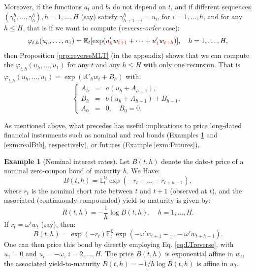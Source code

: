 \documentclass[
  12pt,
]{book}
\theoremstyle{definition}
\theoremstyle{definition}
\newtheorem{example}{Example}[chapter]
\theoremstyle{definition}
\theoremstyle{definition}
\theoremstyle{remark}
\begin{document}
Moreover, if the functions \(a_{t}\) and \(b_{t}\) do not depend on \(t\), and if different sequences \((\gamma^h_1,\dots,\gamma^h_h), h=1,\dots,H\) (say) satisfy \(\gamma^h_{h+1-i} = u_i\), for
\(i=1,\dots,h\), and for any \(h \leq H\), that is if we want to compute (\emph{reverse-order} case):
\begin{equation}
\varphi_{t,h}(u_h,\dots,u_1)=\mathbb{E}_t[\exp(u'_{{\color{red}h}} w_{{\color{red}t+1}}+\dots+u'_{{\color{red}1}} w_{{\color{red}t+h}})],
\quad h=1,\dots,H,\label{eq:LTreverse}
\end{equation}
then Proposition \ref{prp:reverseMLT} (in the appendix) shows that we can compute the \(\varphi_{t,h}(u_h,\dots,u_1)\) for any \(t\) and any \(h \leq H\) with only one recursion. That is \(\varphi_{t,h}(u_h,\dots,u_1)=\exp(A'_hw_t+B_h)\) with:
\begin{equation*}
\left\{
\begin{array}{ccl}
A_{h} &=& a(u_{h} + A_{h-1}), \\
B_{h} &=& b(u_{h} + A_{h-1}) + B_{h-1}, \\
A_{0} &=& 0,\quad  B_{0} = 0.
\end{array}
\right.
\end{equation*}

As mentioned above, what precedes has useful implications to price long-dated financial instruments such as nominal and real bonds (Examples \ref{exm:nominalBth} and \ref{exm:realBth}, respectively), or futures (Example \ref{exm:Futures}).

\begin{example}[Nominal interest rates]
\protect\hypertarget{exm:nominalBth}{}\label{exm:nominalBth}Let \(B(t,h)\) denote the date-\(t\) price of a nominal zero-coupon bond of maturity \(h\). We Have:
\begin{equation}
B(t,h) = \mathbb{E}^{\mathbb{Q}}_t \exp (-r_{t}-\dots-r_{t+h-1}),\label{eq:stdbond}
\end{equation}
where \(r_{t}\) is the nominal short rate between \(t\) and \(t+1\) (observed at \(t\)), and the associated (continuously-compounded) yield-to-maturity is given by:
\begin{equation}
R(t,h) = -  \frac{1}{h}   \log   B(t,h), \quad   h=1,\dots,H.
\end{equation}
If \(r_t = \omega'w_t\) (say), then:
\[
B(t,h) = \exp(-r_{t}) \mathbb{E}^{\mathbb{Q}}_t \exp(-\omega' w_{t+1} - \dots - \omega' w_{t+h-1}).
\]
One can then price this bond by directly employing Eq. \eqref{eq:LTreverse}, with \(u_1 = 0\) and \(u_i = - \omega\), \(i = 2,\dots, H\).
The price \(B(t,h)\) is exponential affine in \(w_t\), the associated yield-to-maturity \(R(t,h)=-1/h\log B(t,h)\) is affine in \(w_t\).
\end{example}
\end{document}
